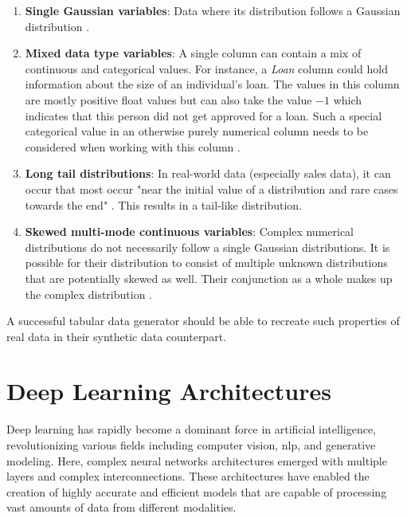 \begin{enumerate}
    \item \textbf{Single Gaussian variables}: Data where its distribution follows a Gaussian distribution \cite{zhao2022CTABGANEnhancingTabular}.
    \item \textbf{Mixed data type variables}: A single column can contain a mix of continuous and categorical values. 
    For instance, a \textit{Loan} column could hold information about the size of an individual's loan.
    The values in this column are mostly positive float values but can also take the value \textit{$-1$} which indicates that this person did not get approved for a loan.
    Such a special categorical value in an otherwise purely numerical column needs to be considered when working with this column \cite{zhao2022CTABGANEnhancingTabular}.
    \item \textbf{Long tail distributions}: In real-world data (especially sales data), it can occur that most occur "near the initial value of a distribution and rare cases towards the end" \cite[p. 3]{zhao2022CTABGANEnhancingTabular}.
    This results in a tail-like distribution.
    \item \textbf{Skewed multi-mode continuous variables}: Complex numerical distributions do not necessarily follow a single Gaussian distributions.
    It is possible for their distribution to consist of multiple unknown distributions that are potentially skewed as well. 
    Their conjunction as a whole makes up the complex distribution \cite{zhao2022CTABGANEnhancingTabular}.
\end{enumerate}

A successful tabular data generator should be able to recreate such properties of real data in their synthetic data counterpart.


\section{Deep Learning Architectures}
\label{ch:preliminaries-deepLearningArchitectures}

Deep learning has rapidly become a dominant force in artificial intelligence, revolutionizing various fields including computer vision, \gls{nlp}, and generative modeling. 
Here, complex neural networks architectures emerged with multiple layers and complex interconnections.
These architectures have enabled the creation of highly accurate and efficient models that are capable of processing vast amounts of data from different modalities.


